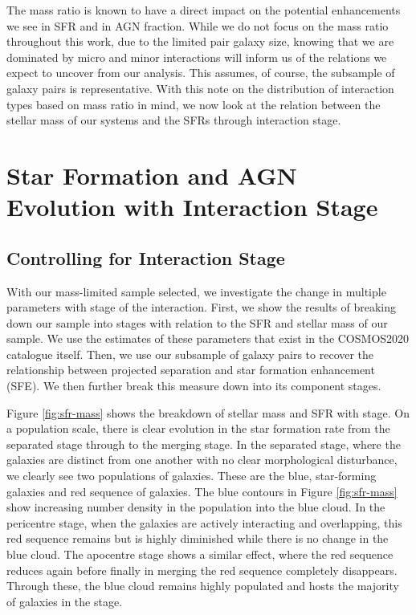 The mass ratio is known to have a direct impact on the potential enhancements we see in SFR and in AGN fraction. While we do not focus on the mass ratio throughout this work, due to the limited pair galaxy size, knowing that we are dominated by micro and minor interactions will inform us of the relations we expect to uncover from our analysis. This assumes, of course, the subsample of galaxy pairs is representative. With this note on the distribution of interaction types based on mass ratio in mind, we now look at the relation between the stellar mass of our systems and the SFRs through interaction stage.

\section{Star Formation and AGN Evolution with Interaction Stage}\label{results:SF_stage}
\subsection{Controlling for Interaction Stage}\label{results:int_stage}
\noindent With our mass-limited sample selected, we investigate the change in multiple parameters with stage of the interaction. First, we show the results of breaking down our sample into stages with relation to the SFR and stellar mass of our sample. We use the estimates of these parameters that exist in the COSMOS2020 catalogue itself. Then, we use our subsample of galaxy pairs to recover the relationship between projected separation and star formation enhancement (SFE). We then further break this measure down into its component stages.

Figure \ref{fig:sfr-mass} shows the breakdown of stellar mass and SFR with stage. On a population scale, there is clear evolution in the star formation rate from the separated stage through to the merging stage. In the separated stage, where the galaxies are distinct from one another with no clear morphological disturbance, we clearly see two populations of galaxies. These are the blue, star-forming galaxies and red sequence of galaxies. The blue contours in Figure \ref{fig:sfr-mass} show increasing number density in the population into the blue cloud. In the pericentre stage, when the galaxies are actively interacting and overlapping, this red sequence remains but is highly diminished while there is no change in the blue cloud. The apocentre stage shows a similar effect, where the red sequence reduces again before finally in merging the red sequence completely disappears. Through these, the blue cloud remains highly populated and hosts the majority of galaxies in the stage.

